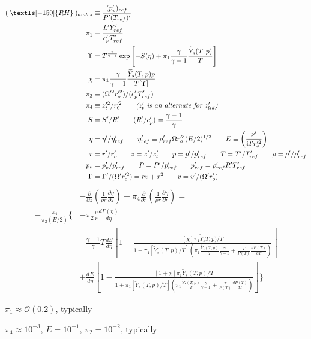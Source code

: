 \documentclass[preprint, prX]{revtex4}
\newcommand{\pfrac}[2]{\left(\frac{#1}{#2}\right)}
\newcommand{\dd}[2]{\frac{d#1}{d#2}}
\newcommand{\pd}[2]{\frac{\partial#1}{\partial#2}}
\newcommand{\gogmo}{\frac{\gamma}{\gamma-1}}
\newcommand{\rh}{\:\textls[-150]{RH}\:}
\begin{document}
\begin{itemize}
\begin{equation}
\begin{split}
(\rh)_{amb,s} &\equiv \frac{(p_v')_{ref}}{P'(T_{ref})'}\\
\pi_1 &\equiv \frac{L'Y_{ref}'}{c_p' T_{ref}'} \\
\Upsilon &= T^\gogmo \exp\left[ -S(\eta) + \pi_1 \gogmo \frac{\widetilde{Y}_s(T,p)}{T}\right] \\
\chi &= \pi_1 \gogmo \frac{\widetilde{Y}_s(T,p) p}{T[\Upsilon]} \\
\pi_2 &\equiv (\Omega'^2 r_o'^2)/(c_p'T_{ref}') \\
\pi_4 &\equiv z_t'^2 / r_0'^2 \qquad \textit{($z_t'$ is an alternate for $z_{lid}'$)} \\
S &= S'/R' \qquad (R'/c_p') = \frac{\gamma-1}{\gamma} \\
\eta &= \eta'/\eta_{ref}' \qquad \eta_{ref}' \equiv \rho_{ref}'\Omega r_o'^3 (E/2)^{1/2} \qquad E \equiv \pfrac{\nu'}{\Omega' r_o'^2}\\
r &= r'/r_o' \qquad z= z'/z_t' \qquad p= p'/p_{ref}' \qquad T=T'/T_{ref}' \qquad \rho = \rho'/\rho_{ref}' \\
p_v &= p_v'/p_{ref}' \qquad P= P'/p_{ref}' \qquad p_{ref}' = \rho_{ref}'R'T_{ref}' \\
\Gamma &= \Gamma'/(\Omega'r_o'^2) = r v + r^2 \qquad v = v'/(\Omega' r_o') 
\end{split}
\end{equation}
\begin{equation}
\begin{split}
&-\pd{}{z} \left( \frac{1}{\rho r}\pd{\eta}{z} \right) - \pi_4 \pd{}{r} \left( \frac{1}{\rho r}\pd{\eta}{r} \right) = \\
-\frac{\pi_4}{\pi_2(E/2)} \Bigg\{&- \pi_2 \frac{v}{r}\dd{\Gamma(\eta)}{\eta} \\
&-\frac{\gamma -1}{\gamma}T \dd{S}{\eta}\left[ 1- \frac{[\chi]\pi_1 \widetilde{Y}_sT,p)/T}{1+\pi_1[\widetilde{Y}_s(T,p)/T]\left( \pi_1 \frac{\widetilde{Y}_s(T,p)}{T}\gogmo + \frac{T}{P(T)}\dd{P(T)}{T}\right)}\right] \\
&+ \dd{E}{\eta}\left[ 1- \frac{[1+\chi]\pi_1 \widetilde{Y}_s(T,p)/T}{1+\pi_1[\widetilde{Y}_s(T,p)/T]\left( \pi_1 \frac{\widetilde{Y}_s(T,p)}{T}\gogmo + \frac{T}{P(T)}\dd{P(T)}{T}\right)}\right] 
\Bigg\}
\end{split}
\end{equation}

$\pi_1 \approx \mathcal{O}(0.2)$, typically

$\pi_4 \approx 10^{-3}$, $E=10^{-1}$, $\pi_2 = 10^{-2}$, typically

\end{itemize}
\end{document}
